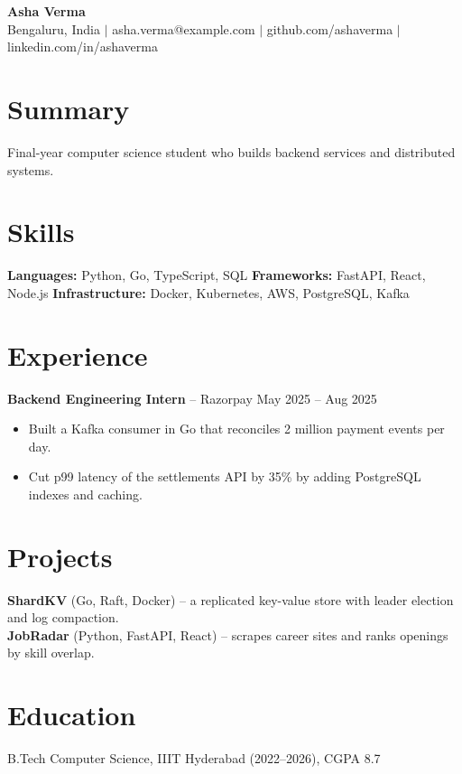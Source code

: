 \documentclass[10pt]{article}
\begin{document}
\begin{center}{\Large\textbf{Asha Verma}}\\ Bengaluru, India $|$ asha.verma@example.com $|$ github.com/ashaverma $|$ linkedin.com/in/ashaverma\end{center}
\section*{Summary}
Final-year computer science student who builds backend services and distributed systems.
\section*{Skills}
\textbf{Languages:} Python, Go, TypeScript, SQL \quad \textbf{Frameworks:} FastAPI, React, Node.js \quad \textbf{Infrastructure:} Docker, Kubernetes, AWS, PostgreSQL, Kafka
\section*{Experience}
\textbf{Backend Engineering Intern} -- Razorpay \hfill May 2025 -- Aug 2025
\begin{itemize}
\item Built a Kafka consumer in Go that reconciles 2 million payment events per day.
\item Cut p99 latency of the settlements API by 35\% by adding PostgreSQL indexes and caching.
\end{itemize}
\section*{Projects}
\textbf{ShardKV} (Go, Raft, Docker) -- a replicated key-value store with leader election and log compaction.\\
\textbf{JobRadar} (Python, FastAPI, React) -- scrapes career sites and ranks openings by skill overlap.
\section*{Education}
B.Tech Computer Science, IIIT Hyderabad (2022--2026), CGPA 8.7
\end{document}
